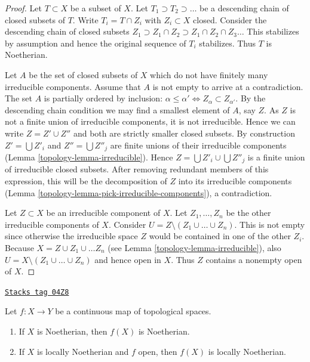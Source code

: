 \begin{proof}

Let $T \subset X$ be a subset of $X$.
Let $T_1 \supset T_2 \supset \ldots$
be a descending chain of closed subsets of $T$.
Write $T_i =  T \cap Z_i$ with $Z_i \subset X$ closed.
Consider the descending chain of closed subsets
$Z_1 \supset Z_1\cap Z_2 \supset Z_1 \cap Z_2 \cap Z_3 \ldots$
This stabilizes by assumption and hence the original sequence
of $T_i$ stabilizes. Thus $T$ is Noetherian.

\medskip\noindent
Let $A$ be the set of closed subsets of $X$ which do not
have finitely many irreducible components. Assume that
$A$ is not empty to arrive at a contradiction.
The set $A$ is partially ordered by inclusion: $\alpha \leq \alpha'
\Leftrightarrow Z_{\alpha} \subset Z_{\alpha'}$.
By the descending chain condition we may find a
smallest element of $A$, say $Z$. As $Z$ is not a finite
union of irreducible components, it is not irreducible.
Hence we can write $Z = Z' \cup Z''$ and both are strictly smaller
closed subsets. By construction $Z' = \bigcup Z'_i$ and
$Z'' = \bigcup Z''_j$ are finite unions of their irreducible
components (Lemma \ref{topology-lemma-irreducible}).
Hence $Z = \bigcup Z'_i \cup \bigcup Z''_j$ is
a finite union of irreducible closed subsets.
After removing redundant members of this expression,
this will be the decomposition of $Z$ into its irreducible
components (Lemma \ref{topology-lemma-pick-irreducible-components}), a contradiction.

\medskip\noindent
Let $Z \subset X$ be an irreducible component of $X$.
Let $Z_1, \ldots, Z_n$ be the other irreducible components
of $X$. Consider $U = Z \setminus (Z_1\cup\ldots\cup Z_n)$.
This is not empty since otherwise the irreducible space
$Z$ would be contained in one of the other $Z_i$.
Because $X = Z \cup Z_1 \cup \ldots Z_n$ (see Lemma \ref{topology-lemma-irreducible}),
also $U = X \setminus (Z_1\cup\ldots\cup Z_n)$
and hence open in $X$. Thus $Z$ contains a nonempty
open of $X$.
\end{proof}

\begin{lemma}
\label{topology-lemma-image-Noetherian}
\href{https://stacks.math.columbia.edu/tag/04Z8}{\texttt{Stacks tag 04Z8}}

Let $f : X \to Y$ be a continuous map of topological spaces.
\begin{enumerate}
\item If $X$ is Noetherian, then $f(X)$ is Noetherian.
\item If $X$ is locally Noetherian and $f$ open, then $f(X)$ is
locally Noetherian.
\end{enumerate}
\end{lemma}

